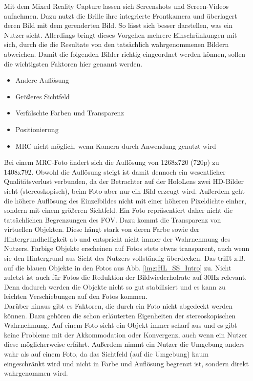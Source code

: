 Mit dem Mixed Reality Capture lassen sich Screenshots und Screen-Videos aufnehmen. Dazu nutzt die Brille ihre integrierte Frontkamera und überlagert deren Bild mit dem gerenderten Bild. So lässt sich besser darstellen, was ein Nutzer sieht. Allerdings bringt dieses Vorgehen mehrere Einschränkungen mit sich, durch die die Resultate von den tatsächlich wahrgenommenen Bildern abweichen. Damit die folgenden Bilder richtig eingeordnet werden können, sollen die wichtigsten Faktoren hier genannt werden.

\begin{itemize}
	\singlespacing
	\item Andere Auflösung
	\item Größeres Sichtfeld
	\item Verfälschte Farben und Transparenz
	\item Positionierung
	\item MRC nicht möglich, wenn Kamera durch Anwendung genutzt wird
\end{itemize}

Bei einem MRC-Foto ändert sich die Auflösung von 1268x720 (720p) zu 1408x792. Obwohl die Auflösung steigt ist damit dennoch ein wesentlicher Qualitätsverlust verbunden, da der Betrachter auf der HoloLens zwei HD-Bilder sieht (stereoskopisch), beim Foto aber nur ein Bild erzeugt wird. Außerdem geht die höhere Auflösung des Einzelbildes nicht mit einer höheren Pixeldichte einher, sondern mit einem größeren Sichtfeld. Ein Foto repräsentiert daher nicht die tatsächlichen Begrenzungen des FOV. Dazu kommt die Transparenz von virtuellen Objekten. Diese hängt stark von deren Farbe sowie der Hintergrundhelligkeit ab und entspricht nicht immer der Wahrnehmung des Nutzers. Farbige Objekte erscheinen auf Fotos stets etwas transparent, auch wenn sie den Hintergrund aus Sicht des Nutzers vollständig überdecken. Das trifft z.B. auf die blauen Objekte in den Fotos aus Abb. \ref{img:HL_SS_Intro} zu. Nicht zuletzt ist auch für Fotos die Reduktion der Bildwiederholrate auf 30Hz relevant. Denn dadurch werden die Objekte nicht so gut stabilisiert und es kann zu leichten Verschiebungen auf den Fotos kommen.\\

Darüber hinaus gibt es Faktoren, die durch ein Foto nicht abgedeckt werden können. Dazu gehören die schon erläuterten Eigenheiten der stereoskopischen Wahrnehmung. Auf einem Foto sieht ein Objekt immer scharf aus und es gibt keine Probleme mit der Akkommodation oder Konvergenz, auch wenn ein Nutzer diese möglicherweise erfährt. Außerdem nimmt ein Nutzer die Umgebung anders wahr als auf einem Foto, da das Sichtfeld (auf die Umgebung) kaum eingeschränkt wird und nicht in Farbe und Auflösung begrenzt ist, sondern direkt wahrgenommen wird.\\

